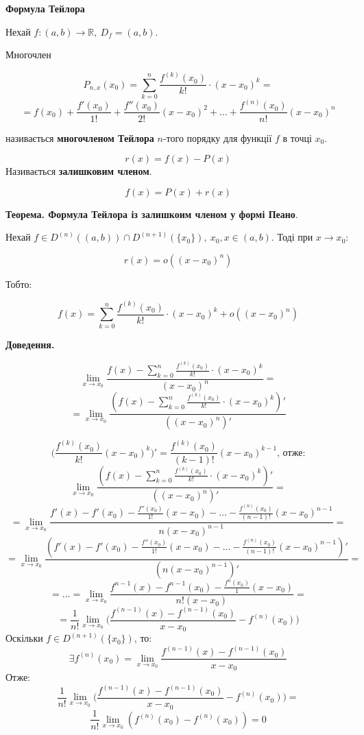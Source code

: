 \documentclass[12pt]{report}
\begin{document}
\begin{center}
\textbf{Формула Тейлора}
\end{center}

Нехай $f : (a,b) \to \mathbb{R},\ D_f = (a,b)$.

Многочлен

$$P_{n,x}(x_0) = \sum_{k = 0}^{n}\frac{f^{(k)}(x_0)}{k!} \cdot (x-x_0)^k = $$
$$= f(x_0) + \frac{f'(x_0)}{1!} + \frac{f''(x_0)}{2!}(x-x_0)^2 + \ldots + \frac{f^{(n)}(x_0)}{n!} (x-x_0)^n$$

називається \textbf{многочленом Тейлора} $n$-того порядку для функції $f$ в точці $x_0$.

$$r(x) = f(x) - P(x)$$
Називається \textbf{залишковим членом}.

$$f(x) = P(x) + r(x)$$

\textbf{Теорема. Формула Тейлора із залишкоим членом у формі Пеано}.

Нехай $f\in D^{(n)}((a,b)) \cap D^{(n+1)}(\{ x_0\}),\ x_0, x \in (a,b)$. Тоді при $x \to x_0$:

$$r(x) = o((x - x_0)^n)$$

Тобто:

$$f(x) = \sum_{k = 0}^{n}\frac{f^{(k)}(x_0)}{k!} \cdot (x-x_0)^k + o((x - x_0)^n)$$

\textbf{Доведення.}

$$\lim_{x\to x_0}\frac{f(x) - \sum_{k = 0}^{n}\frac{f^{(k)}(x_0)}{k!} \cdot (x-x_0)^k}{(x - x_0)^n} = $$
$$ = \lim_{x\to x_0}\frac{(f(x) - \sum_{k = 0}^{n}\frac{f^{(k)}(x_0)}{k!} \cdot (x-x_0)^k)'}{((x - x_0)^n)'} $$

$$\Big(\frac{f^{(k)}(x_0)}{k!} (x - x_0)^k\Big)' = \frac{f^{(k)}(x_0)}{(k-1)!} (x - x_0)^{k-1}\textrm{, отже:}$$
$$\lim_{x\to x_0}\frac{(f(x) - \sum_{k = 0}^{n}\frac{f^{(k)}(x_0)}{k!} \cdot (x-x_0)^k)'}{((x - x_0)^n)'} = $$
$$= \lim_{x \to x_0}\frac{f'(x) - f'(x_0) - \frac{f''(x_0)}{1!}(x - x_0) - \ldots - \frac{f^{(n)}(x_0)}{(n-1)!} (x - x_0)^{n-1}}{n(x - x_0)^{n-1}} = $$
$$= \lim_{x \to x_0}\frac{(f'(x) - f'(x_0) - \frac{f''(x_0)}{1!}(x - x_0) - \ldots - \frac{f^{(n)}(x_0)}{(n-1)!} (x - x_0)^{n-1})'}{(n(x - x_0)^{n-1})'} = $$
$$= \ldots = \lim_{x \to x_0}\frac{f^{n-1}(x) - f^{n-1}(x_0) - \frac{f^{n}(x_0)}{1} (x - x_0)}{n! (x - x_0)} = $$
$$= \frac{1}{n!} \lim_{x\to x_0}\Big( \frac{f^{(n-1)}(x) - f^{(n-1)}(x_0)}{x - x_0} - f^{(n)}(x_0)\Big)$$
Оскільки $f \in D^{(n+1)}(\{ x_0\})$, то:
$$\exists f^{(n)}(x_0) = \lim_{x\to x_0} \frac{f^{(n-1)}(x) - f^{(n-1)}(x_0)}{x - x_0}$$
Отже: 
$$\frac{1}{n!} \lim_{x\to x_0}\Big( \frac{f^{(n-1)}(x) - f^{(n-1)}(x_0)}{x - x_0} - f^{(n)}(x_0)\Big) = $$
$$\frac{1}{n!} \lim_{x \to x_0}(f^{(n)}(x_0) - f^{(n)}(x_0)) = 0$$
\end{document}
